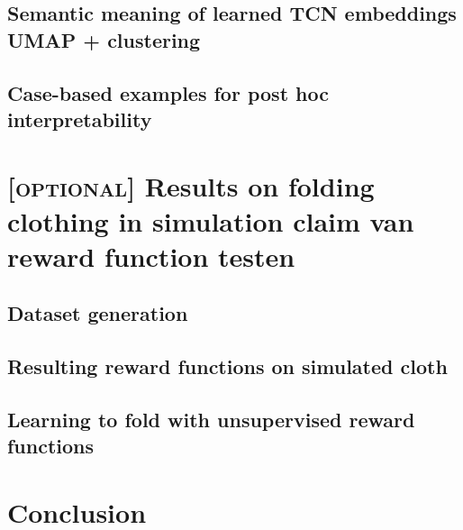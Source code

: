 \documentclass[\home/main.tex]{subfiles}
\begin{document}
\subsection{Semantic meaning of learned TCN embeddings {\tiny UMAP + clustering}}
\subsection{Case-based examples for post hoc interpretability}

\section{\textsc{[optional]} Results on folding clothing in simulation {\tiny claim van reward function testen}}
\subsection{Dataset generation}
\subsection{Resulting reward functions on simulated cloth}
\subsection{Learning to fold with unsupervised reward functions}

\section{Conclusion}
\end{document}
